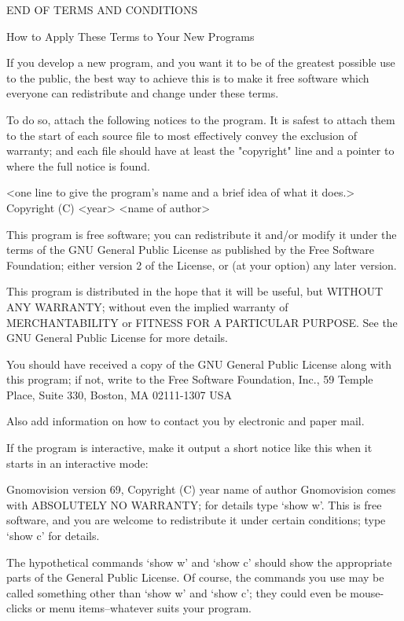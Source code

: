                      END OF TERMS AND CONDITIONS

            How to Apply These Terms to Your New Programs

  If you develop a new program, and you want it to be of the greatest
possible use to the public, the best way to achieve this is to make it
free software which everyone can redistribute and change under these terms.

  To do so, attach the following notices to the program.  It is safest
to attach them to the start of each source file to most effectively
convey the exclusion of warranty; and each file should have at least
the "copyright" line and a pointer to where the full notice is found.

    <one line to give the program's name and a brief idea of what it does.>
    Copyright (C) <year>  <name of author>

    This program is free software; you can redistribute it and/or modify
    it under the terms of the GNU General Public License as published by
    the Free Software Foundation; either version 2 of the License, or
    (at your option) any later version.

    This program is distributed in the hope that it will be useful,
    but WITHOUT ANY WARRANTY; without even the implied warranty of
    MERCHANTABILITY or FITNESS FOR A PARTICULAR PURPOSE.  See the
    GNU General Public License for more details.

    You should have received a copy of the GNU General Public License
    along with this program; if not, write to the Free Software
    Foundation, Inc., 59 Temple Place, Suite 330, Boston, MA  02111-1307  USA

Also add information on how to contact you by electronic and paper mail.

If the program is interactive, make it output a short notice like this
when it starts in an interactive mode:

    Gnomovision version 69, Copyright (C) year name of author
    Gnomovision comes with ABSOLUTELY NO WARRANTY; for details type `show w'.
    This is free software, and you are welcome to redistribute it
    under certain conditions; type `show c' for details.

The hypothetical commands `show w' and `show c' should show the appropriate
parts of the General Public License.  Of course, the commands you use may
be called something other than `show w' and `show c'; they could even be
mouse-clicks or menu items--whatever suits your program.

